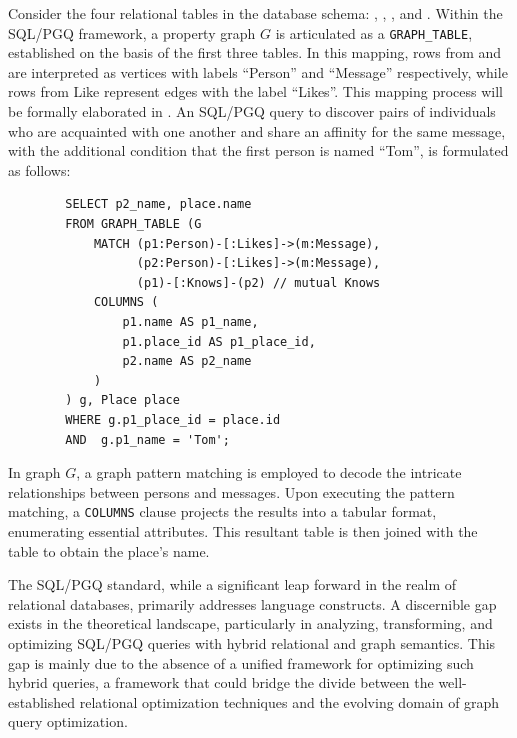 \begin{example}
    \label{example:introduction:sqlpgq}
    Consider the four relational tables in the database schema: , , , and . Within the SQL/PGQ framework, a property graph $G$ is articulated as a \lstinline{GRAPH_TABLE}, established on the basis of the first three tables. In this mapping, rows from  and  are interpreted as vertices with labels ``Person'' and ``Message'' respectively, while rows from Like represent edges with the label ``Likes''. This mapping process will be formally elaborated in . An SQL/PGQ query to discover pairs of individuals who are acquainted with one another and share an affinity for the same message, with the additional condition that the first person is named ``Tom'', is formulated as follows:
    \begin{lstlisting}
        SELECT p2_name, place.name
        FROM GRAPH_TABLE (G
            MATCH (p1:Person)-[:Likes]->(m:Message),
                  (p2:Person)-[:Likes]->(m:Message),
                  (p1)-[:Knows]-(p2) // mutual Knows
            COLUMNS (
                p1.name AS p1_name,
                p1.place_id AS p1_place_id,
                p2.name AS p2_name
            )
        ) g, Place place
        WHERE g.p1_place_id = place.id
        AND  g.p1_name = 'Tom';
    \end{lstlisting}
    In graph $G$, a graph pattern matching is employed to decode the intricate relationships between persons and messages. Upon executing the pattern matching, a \lstinline{COLUMNS} clause projects the results into a tabular format, enumerating essential attributes. This resultant table is then joined with the  table to obtain the place's name.
\end{example}

The SQL/PGQ standard, while a significant leap forward in the realm of relational databases, primarily addresses language constructs. A discernible gap exists in the theoretical landscape, particularly in analyzing, transforming, and optimizing SQL/PGQ queries with hybrid relational and graph semantics. This gap is mainly due to the absence of a unified framework for optimizing such hybrid queries, a framework that could bridge the divide between the well-established relational optimization techniques and the evolving domain of graph query optimization.

